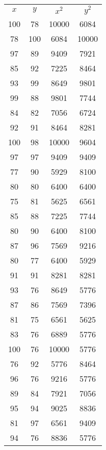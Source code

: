 \documentclass{article}
\begin{document}
    \begin{figure}
        \begin{center}
            \begin{tabular}{cccc}
                $x$&$y$&$x^2$&$y^2$\\
                100 & 78 & 10000 & 6084 \\
                78 & 100 & 6084 & 10000 \\
                97 & 89 & 9409 & 7921 \\
                85 & 92 & 7225 & 8464 \\
                93 & 99 & 8649 & 9801 \\
                99 & 88 & 9801 & 7744 \\
                84 & 82 & 7056 & 6724 \\
                92 & 91 & 8464 & 8281 \\
                100 & 98 & 10000 & 9604 \\
                97 & 97 & 9409 & 9409 \\
                77 & 90 & 5929 & 8100 \\
                80 & 80 & 6400 & 6400 \\
                75 & 81 & 5625 & 6561 \\
                85 & 88 & 7225 & 7744 \\
                80 & 90 & 6400 & 8100 \\
                87 & 96 & 7569 & 9216 \\
                80 & 77 & 6400 & 5929 \\
                91 & 91 & 8281 & 8281 \\
                93 & 76 & 8649 & 5776 \\
                87 & 86 & 7569 & 7396 \\
                81 & 75 & 6561 & 5625 \\
                83 & 76 & 6889 & 5776 \\
                100 & 76 & 10000 & 5776 \\
                76 & 92 & 5776 & 8464 \\
                96 & 76 & 9216 & 5776 \\
                89 & 84 & 7921 & 7056 \\
                95 & 94 & 9025 & 8836 \\
                81 & 97 & 6561 & 9409 \\
                94 & 76 & 8836 & 5776 \\

\end{tabular}
\end{center}
\end{figure}
\end{document}
